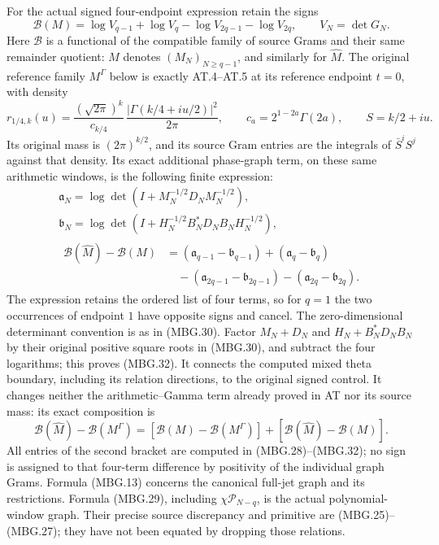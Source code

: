 For the actual signed four-endpoint expression retain the signs
\[
 \mathcal B(M)=
 \log V_{q-1}+\log V_q
                  -\log V_{2q-1}-\log V_{2q},\qquad V_N=\det G_N .
 \tag{MBG.31}\label{GraphV2:eq:mbg-signed-four}
\]
Here \(\mathcal B\) is a functional of the compatible family of
source Grams and their same remainder quotient: \(M\) denotes
\((M_N)_{N\ge q-1}\), and similarly for \(\widehat M\).
The original reference family \(M^\Gamma\) below is exactly
AT.4--AT.5 at its reference endpoint \(t=0\), with density
\[
 r_{1/4,k}(u)=\frac{(\sqrt{2\pi})^k}{c_{k/4}}\,
      \frac{|\Gamma(k/4+iu/2)|^2}{2\pi},
 \qquad c_a=2^{1-2a}\Gamma(2a),\qquad S=k/2+iu.
 \tag{MBG.31a}\label{GraphV2:eq:mbg-Gamma-reference}
\]
Its original mass is \((2\pi)^{k/2}\), and its source Gram entries
are the integrals of \(\bar S^iS^j\) against that density.
Its exact additional phase-graph term, on these same arithmetic
windows, is the following finite expression:
\[
 \begin{gathered}
 \mathfrak a_N=\log\det(I+M_N^{-1/2}D_NM_N^{-1/2}),\\
 \mathfrak b_N=\log\det(I+H_N^{-1/2}B_N^*D_NB_NH_N^{-1/2}),\\
 \begin{aligned}
 \mathcal B(\widehat M)-\mathcal B(M)
 &= (\mathfrak a_{q-1}-\mathfrak b_{q-1})
       +(\mathfrak a_q-\mathfrak b_q)\\
 &\quad-(\mathfrak a_{2q-1}-\mathfrak b_{2q-1})
       -(\mathfrak a_{2q}-\mathfrak b_{2q}).
 \end{aligned}
 \end{gathered}
 \tag{MBG.32}\label{GraphV2:eq:mbg-four-exact}
\]
The expression retains the ordered list of four terms, so for \(q=1\) the
two occurrences of endpoint \(1\) have opposite signs and cancel.
The zero-dimensional determinant convention is as in (MBG.30).
Factor \(M_N+D_N\) and
\(H_N+B_N^*D_NB_N\) by their original positive square roots in
(MBG.30), and subtract the four logarithms; this proves (MBG.32).
It connects the computed mixed theta boundary, including its
relation directions, to the original signed control.
It changes neither the arithmetic--Gamma term already proved in AT
nor its source mass: its exact composition is
\[
 \mathcal B(\widehat M)-\mathcal B(M^\Gamma)
 =[\mathcal B(M)-\mathcal B(M^\Gamma)]
                  +[\mathcal B(\widehat M)-\mathcal B(M)] .
 \tag{MBG.33}\label{GraphV2:eq:mbg-Gamma-composition}
\]
All entries of the second bracket are computed in (MBG.28)--(MBG.32);
no sign is assigned to that four-term difference by positivity of
the individual graph Grams. Formula (MBG.13) concerns the canonical
full-jet graph and its restrictions. Formula (MBG.29), including
\(\chi\mathcal P_{N-q}\), is the actual polynomial-window graph.
Their precise source discrepancy and primitive are (MBG.25)--(MBG.27);
they have not been equated by dropping those relations.

